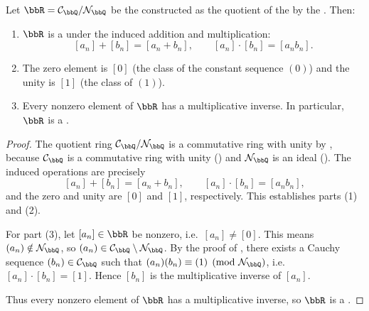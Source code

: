 \begin{proposition} \label{proposition:real_numbers_form_field}
    Let $\bbR = \mathcal{C}_\bbQ / \mathcal{N}_\bbQ$ be the  constructed as the quotient of the  by the . Then:
    \begin{enumerate}
        \item $\bbR$ is a  under the induced addition and multiplication:
        $$[a_n] + [b_n] = [a_n + b_n], \qquad [a_n] \cdot [b_n] = [a_n b_n].$$
        \item The zero element is $[0]$ (the class of the constant sequence $(0)$) and the unity is $[1]$ (the class of $(1)$).
        \item Every nonzero element of $\bbR$ has a multiplicative inverse. In particular, $\bbR$ is a .
    \end{enumerate}
\end{proposition}

\begin{proof}
    The quotient ring $\mathcal{C}_\bbQ / \mathcal{N}_\bbQ$ is a commutative ring with unity by , because $\mathcal{C}_\bbQ$ is a commutative ring with unity () and $\mathcal{N}_\bbQ$ is an ideal (). The induced operations are precisely
    $$[a_n] + [b_n] = [a_n + b_n], \qquad [a_n] \cdot [b_n] = [a_n b_n],$$
    and the zero and unity are $[0]$ and $[1]$, respectively. This establishes parts (1) and (2).

    For part (3), let $[a_n] \in \bbR$ be nonzero, i.e.\ $[a_n] \neq [0]$. This means $(a_n) \notin \mathcal{N}_\bbQ$, so $(a_n) \in \mathcal{C}_\bbQ \setminus \mathcal{N}_\bbQ$. By the proof of , there exists a Cauchy sequence $(b_n) \in \mathcal{C}_\bbQ$ such that $(a_n)(b_n) \equiv (1) \pmod{\mathcal{N}_\bbQ}$, i.e.\ $[a_n] \cdot [b_n] = [1]$. Hence $[b_n]$ is the multiplicative inverse of $[a_n]$.

    Thus every nonzero element of $\bbR$ has a multiplicative inverse, so $\bbR$ is a .
\end{proof}